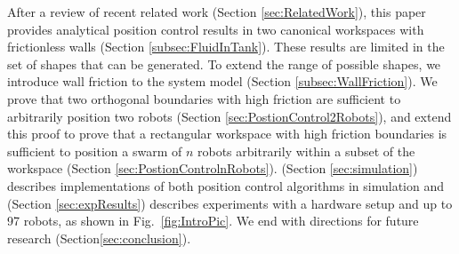 After a review of recent related work (Section \ref{sec:RelatedWork}), this paper provides analytical position control results in two canonical workspaces with frictionless walls (Section \ref{subsec:FluidInTank}).  These results are limited in the set of shapes that can be generated.  To extend the range of possible shapes, we introduce wall friction to the system model (Section \ref{subsec:WallFriction}).  We prove that two orthogonal boundaries with high friction are sufficient to arbitrarily position two robots (Section \ref{sec:PostionControl2Robots}), and extend this proof to prove that a rectangular workspace with high friction boundaries is sufficient to position a swarm of $n$ robots arbitrarily within a subset of the workspace (Section \ref{sec:PostionControlnRobots}).
(Section \ref{sec:simulation}) describes implementations of both position control algorithms in simulation and  (Section \ref{sec:expResults}) describes experiments with a hardware setup and up to 97 robots, as shown in Fig.~\ref{fig:IntroPic}. We end with directions for future research (Section\ref{sec:conclusion}).
